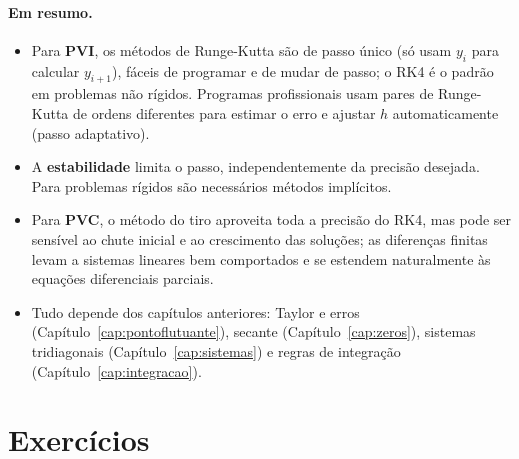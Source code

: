\paragraph{Em resumo.}
\begin{itemize}[nosep]
  \item Para \textbf{PVI}, os métodos de Runge-Kutta são de passo único (só usam $y_i$ para
        calcular $y_{i+1}$), fáceis de programar e de mudar de passo; o RK4 é o padrão em
        problemas não rígidos. Programas profissionais usam pares de Runge-Kutta de ordens
        diferentes para estimar o erro e ajustar $h$ automaticamente (passo adaptativo).
  \item A \textbf{estabilidade} limita o passo, independentemente da precisão desejada. Para
        problemas rígidos são necessários métodos implícitos.
  \item Para \textbf{PVC}, o método do tiro aproveita toda a precisão do RK4, mas pode ser
        sensível ao chute inicial e ao crescimento das soluções; as diferenças finitas levam
        a sistemas lineares bem comportados e se estendem naturalmente às equações
        diferenciais parciais.
  \item Tudo depende dos capítulos anteriores: Taylor e erros (Capítulo~\ref{cap:pontoflutuante}),
        secante (Capítulo~\ref{cap:zeros}), sistemas tridiagonais (Capítulo~\ref{cap:sistemas})
        e regras de integração (Capítulo~\ref{cap:integracao}).
\end{itemize}

\section{Exercícios}

